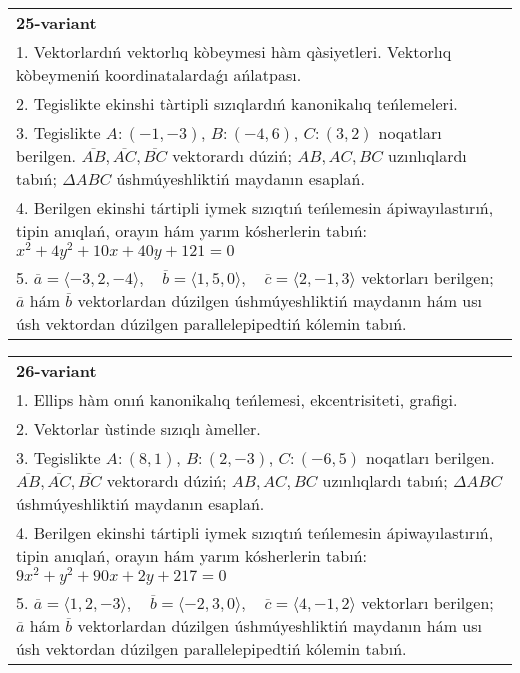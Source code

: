 \documentclass{article}
\begin{document}
\begin{tabular}{m{17cm}}
\textbf{25-variant}\\
1. Vektorlardıń vektorlıq kòbeymesi hàm qàsiyetleri. Vektorlıq kòbeymeniń koordinatalardaǵı ańlatpası. \\

2. Tegislikte ekinshi tàrtipli sızıqlardıń kanonikalıq teńlemeleri.\\

3. Tegislikte $A: (-1, -3)$, $B: (-4, 6)$, $C: (3, 2)$ noqatları berilgen. $\overline{AB}, \overline{AC}, \overline{BC}$ vektorardı dúziń; $AB, AC, BC$ uzınlıqlardı tabıń; $\Delta ABC$ úshmúyeshliktiń maydanın esaplań. \\

4. Berilgen ekinshi tártipli iymek sızıqtıń teńlemesin ápiwayılastırıń, tipin anıqlań, orayın hám yarım kósherlerin tabıń: $x^2+4y^2+10x+40y+121=0$\\

5. \(\overline{a} = \langle -3, 2, -4 \rangle, \quad \overline{b} = \langle 1, 5, 0 \rangle, \quad \overline{c} = \langle 2, -1, 3 \rangle\) vektorları berilgen; \(\overline{a}\) hám \(\overline{b}\) vektorlardan dúzilgen úshmúyeshliktiń maydanın hám usı úsh vektordan dúzilgen parallelepipedtiń kólemin tabıń.
\end{tabular}
\vspace{1cm}


\begin{tabular}{m{17cm}}
\textbf{26-variant}\\
1. Ellips hàm onıń kanonikalıq teńlemesi, ekcentrisiteti, grafigi.\\

2. Vektorlar ùstinde sızıqlı àmeller.\\

3. Tegislikte $A: (8, 1)$, $B: (2, -3)$, $C: (-6, 5)$ noqatları berilgen. $\overline{AB}, \overline{AC}, \overline{BC}$ vektorardı dúziń; $AB, AC, BC$ uzınlıqlardı tabıń; $\Delta ABC$ úshmúyeshliktiń maydanın esaplań. \\

4. Berilgen ekinshi tártipli iymek sızıqtıń teńlemesin ápiwayılastırıń, tipin anıqlań, orayın hám yarım kósherlerin tabıń: $9x^2+y^2+90x+2y+217=0$\\

5. \(\overline{a} = \langle 1, 2, -3 \rangle, \quad \overline{b} = \langle -2, 3, 0 \rangle, \quad \overline{c} = \langle 4, -1, 2 \rangle\) vektorları berilgen; \(\overline{a}\) hám \(\overline{b}\) vektorlardan dúzilgen úshmúyeshliktiń maydanın hám usı úsh vektordan dúzilgen parallelepipedtiń kólemin tabıń.
\end{tabular}
\vspace{1cm}
\end{document}
